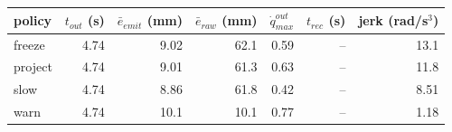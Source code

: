 \begin{tabular}{lrrrrrr}
\toprule
policy & $t_{out}$ (s) & $\bar{e}_{emit}$ (mm) & $\bar{e}_{raw}$ (mm) & $\dot{q}_{max}^{out}$ & $t_{rec}$ (s) & jerk (rad/s$^3$) \\
\midrule
freeze & 4.74 & 9.02 & 62.1 & 0.59 & -- & 13.1 \\
project & 4.74 & 9.01 & 61.3 & 0.63 & -- & 11.8 \\
slow & 4.74 & 8.86 & 61.8 & 0.42 & -- & 8.51 \\
warn & 4.74 & 10.1 & 10.1 & 0.77 & -- & 1.18 \\
\bottomrule
\end{tabular}
